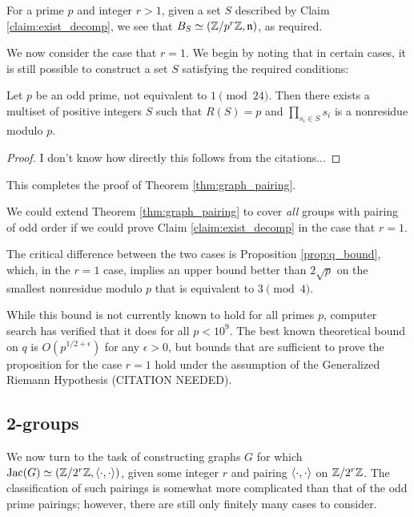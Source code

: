 \documentclass{amsart}
\begin{document}
For a prime $p$ and integer $r > 1$, given a set $S$ described by
Claim \ref{claim:exist_decomp}, we see that $B_S \simeq (\mathbb{Z}/p^r\mathbb{Z},
\mathfrak{n})$, as required.

We now consider the case that $r=1$. We begin by noting that in
certain cases, it is still possible to construct a set $S$
satisfying the required conditions:
\begin{prop}
  Let $p$ be an odd prime, not equivalent to $1 \pmod {24}$. Then
  there exists a multiset of positive integers $S$ such that $R(S) =
  p$ and $\prod_{s_i \in S}s_i$ is a nonresidue modulo $p$.
\end{prop}
\begin{proof}
  I don't know how directly this follows from the citations...
\end{proof}

This completes the proof of Theorem \ref{thm:graph_pairing}.

\begin{remark} We could extend Theorem \ref{thm:graph_pairing} to
  cover \emph{all} groups with pairing of odd order if we could prove
  Claim \ref{claim:exist_decomp} in the case that $r=1$.
  
  The critical difference between the two cases is Proposition
  \ref{prop:q_bound}, which, in the $r=1$ case, implies an upper bound
  better than $2\sqrt{p}$ on the smallest nonresidue modulo $p$ that
  is equivalent to $3 \pmod 4$.

  While this bound is not currently known to hold for all primes $p$,
  computer search has verified that it does for all $p < 10^9$. The
  best known theoretical bound on $q$ is $O(p^{1/2 + \epsilon})$ for
  any $\epsilon > 0$, but bounds that are sufficient to prove the
  proposition for the case $r=1$ hold under the assumption of the
  Generalized Riemann Hypothesis (CITATION NEEDED).
\end{remark}

\subsection{2-groups}

We now turn to the task of constructing graphs $G$ for which $\operatorname{Jac}(G)
\simeq (\mathbb{Z}/2^r\mathbb{Z}, \langle \cdot, \cdot \rangle)$, given some integer $r$ and
pairing $\langle \cdot, \cdot \rangle$ on $\mathbb{Z}/2^r\mathbb{Z}$. The classification of
such pairings is somewhat more complicated than that of the odd prime
pairings; however, there are still only finitely many cases to
consider.
\end{document}
